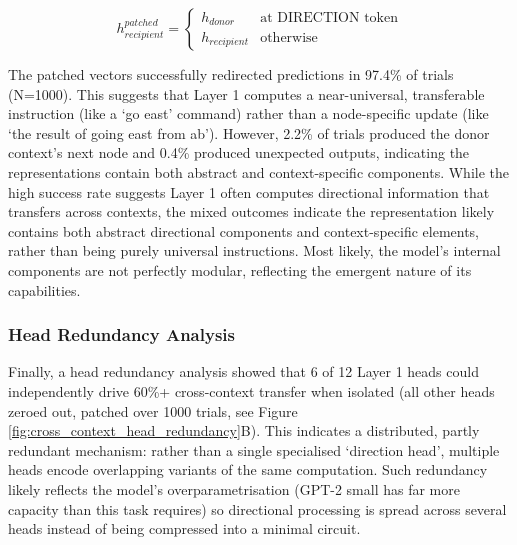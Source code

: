 \begin{equation}
    h_{recipient}^{patched} = \begin{cases}
        h_{donor} & \text{at DIRECTION token} \\
        h_{recipient} & \text{otherwise}
    \end{cases}
\end{equation}

The patched vectors successfully redirected predictions in 97.4\% of trials (N=1000). This suggests that Layer 1 computes a near-universal, transferable instruction (like a `go east' command) rather than a node-specific update (like `the result of going east from ab'). However, 2.2\% of trials produced the donor context's next node and 0.4\% produced unexpected outputs, indicating the representations contain both abstract and context-specific components. While the high success rate suggests Layer 1 often computes directional information that transfers across contexts, the mixed outcomes indicate the representation likely contains both abstract directional components and context-specific elements, rather than being purely universal instructions. Most likely, the model's internal components are not perfectly modular, reflecting the emergent nature of its capabilities.

\subsubsection{Head Redundancy Analysis}

Finally, a head redundancy analysis showed that 6 of 12 Layer 1 heads could independently drive 60\%+ cross-context transfer when isolated (all other heads zeroed out, patched over 1000 trials, see Figure \ref{fig:cross_context_head_redundancy}B). This indicates a distributed, partly redundant mechanism: rather than a single specialised `direction head', multiple heads encode overlapping variants of the same computation. Such redundancy likely reflects the model's overparametrisation (GPT-2 small has far more capacity than this task requires) so directional processing is spread across several heads instead of being compressed into a minimal circuit.




